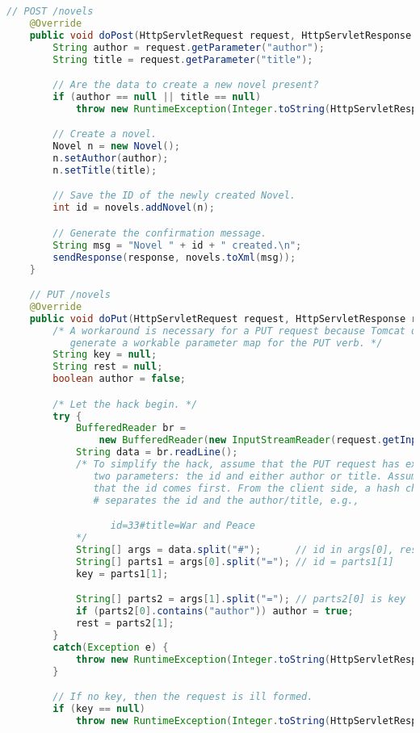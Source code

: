 \documentclass[12pt]{article}
\begin{document}
\begin{lstlisting}[language=java]
    // POST /novels
    @Override
    public void doPost(HttpServletRequest request, HttpServletResponse response) {
        String author = request.getParameter("author");
        String title = request.getParameter("title");

        // Are the data to create a new novel present?
        if (author == null || title == null)
            throw new RuntimeException(Integer.toString(HttpServletResponse.SC_BAD_REQUEST));

        // Create a novel.
        Novel n = new Novel();
        n.setAuthor(author);
        n.setTitle(title);

        // Save the ID of the newly created Novel.
        int id = novels.addNovel(n);

        // Generate the confirmation message.
        String msg = "Novel " + id + " created.\n";
        sendResponse(response, novels.toXml(msg));
    }

    // PUT /novels
    @Override
    public void doPut(HttpServletRequest request, HttpServletResponse response) {
        /* A workaround is necessary for a PUT request because Tomcat does not
           generate a workable parameter map for the PUT verb. */
        String key = null;
        String rest = null;
        boolean author = false;

        /* Let the hack begin. */
        try {
            BufferedReader br =
                new BufferedReader(new InputStreamReader(request.getInputStream()));
            String data = br.readLine();
            /* To simplify the hack, assume that the PUT request has exactly
               two parameters: the id and either author or title. Assume, further,
               that the id comes first. From the client side, a hash character
               # separates the id and the author/title, e.g.,

                  id=33#title=War and Peace
            */
            String[] args = data.split("#");      // id in args[0], rest in args[1]
            String[] parts1 = args[0].split("="); // id = parts1[1]
            key = parts1[1];

            String[] parts2 = args[1].split("="); // parts2[0] is key
            if (parts2[0].contains("author")) author = true;
            rest = parts2[1];
        }
        catch(Exception e) {
            throw new RuntimeException(Integer.toString(HttpServletResponse.SC_INTERNAL_SERVER_ERROR));
        }

        // If no key, then the request is ill formed.
        if (key == null)
            throw new RuntimeException(Integer.toString(HttpServletResponse.SC_BAD_REQUEST));


\end{lstlisting}
\end{document}
